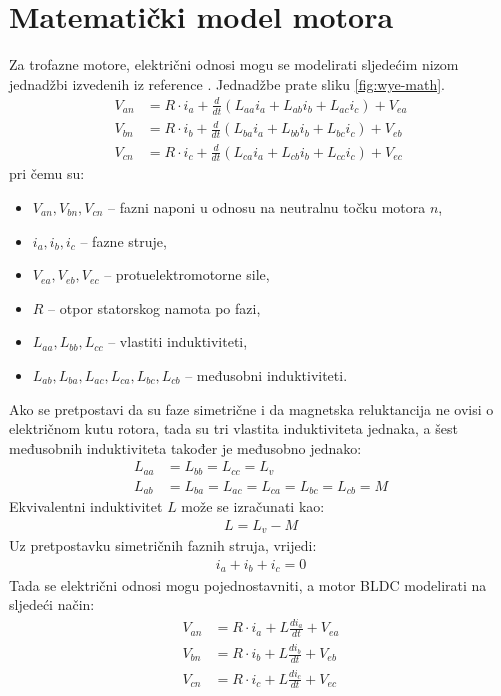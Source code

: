 \documentclass[diplomskirad, upload]{fer}
\begin{document}
\section{Matematički model motora}
\label{sec:mat_model}
Za trofazne motore, električni odnosi mogu se modelirati sljedećim nizom jednadžbi izvedenih iz reference \cite{cite:pmsha}. Jednadžbe prate sliku \ref{fig:wye-math}.
\begin{align}
	V_{an} & = R \cdot i_a + \frac{d}{dt}(L_{aa}i_a + L_{ab}i_b + L_{ac}i_c) + V_{ea} \\
	V_{bn} & = R \cdot i_b + \frac{d}{dt}(L_{ba}i_a + L_{bb}i_b + L_{bc}i_c) + V_{eb} \\
	V_{cn} & = R \cdot i_c + \frac{d}{dt}(L_{ca}i_a + L_{cb}i_b + L_{cc}i_c) + V_{ec}
\end{align}
pri čemu su:
\begin{itemize}
	\item $V_{an}, V_{bn}, V_{cn}$ -- fazni naponi u odnosu na neutralnu točku motora $n$,
	\item $i_a, i_b, i_c$ -- fazne struje,
	\item $V_{ea}, V_{eb}, V_{ec}$ -- protuelektromotorne sile,
	\item $R$ -- otpor statorskog namota po fazi,
	\item $L_{aa}, L_{bb}, L_{cc}$ -- vlastiti induktiviteti,
	\item $L_{ab}, L_{ba}, L_{ac}, L_{ca}, L_{bc}, L_{cb}$ -- međusobni induktiviteti.
\end{itemize}
Ako se pretpostavi da su faze simetrične i da magnetska reluktancija ne ovisi o
električnom kutu rotora, tada su tri vlastita induktiviteta jednaka, a šest
međusobnih induktiviteta također je međusobno jednako:
\begin{align}
	L_{aa} & = L_{bb} = L_{cc} = L_v                          \\
	L_{ab} & = L_{ba} = L_{ac} = L_{ca} = L_{bc} = L_{cb} = M
\end{align}
Ekvivalentni induktivitet $L$ može se izračunati kao:
\begin{align}
	L = L_v - M
\end{align}
Uz pretpostavku simetričnih faznih struja, vrijedi:
\begin{align}
	i_a + i_b + i_c = 0
\end{align}
Tada se električni odnosi mogu pojednostavniti, a motor BLDC modelirati na
sljedeći način:
\begin{align}
	V_{an} & = R \cdot i_a + L\frac{di_a}{dt} + V_{ea} \\
	V_{bn} & = R \cdot i_b + L\frac{di_b}{dt} + V_{eb} \\
	V_{cn} & = R \cdot i_c + L\frac{di_c}{dt} + V_{ec}
\end{align}
\end{document}

